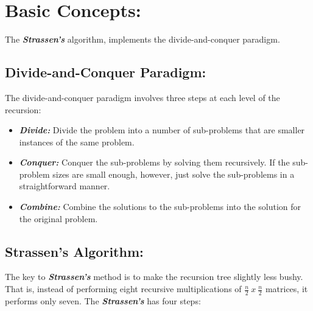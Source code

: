 \section{Basic Concepts:}

The {\bfseries\itshape Strassen's} algorithm, implements the divide-and-conquer paradigm.

\subsection{Divide-and-Conquer Paradigm:}

The divide-and-conquer paradigm involves three steps at each level of the recursion:

\begin{itemize}
\item {\bfseries\itshape Divide:} Divide the problem into a number of sub-problems that are smaller instances of the same problem.
\item {\bfseries\itshape Conquer:} Conquer the sub-problems by solving them recursively. If the sub-problem sizes are small enough, however, just solve the sub-problems in a straightforward manner.
\item {\bfseries\itshape Combine:} Combine the solutions to the sub-problems into the solution for the original problem.
\end{itemize}

\subsection{Strassen's Algorithm:}

The key to {\bfseries\itshape Strassen's} method is to make the recursion tree slightly less bushy. That is, instead of performing eight recursive multiplications of {\bfseries\itshape $\frac{n}{2}\ x\ \frac{n}{2}$} matrices, it performs only seven. The {\bfseries\itshape Strassen's} has four steps: \hfill \break

